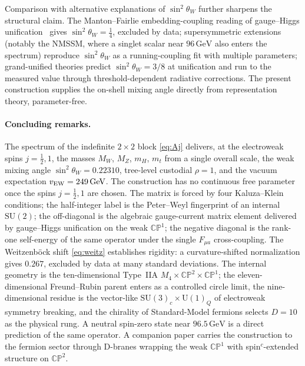 \documentclass[aps,prl,twocolumn,superscriptaddress,floatfix,nofootinbib,reprint]{revtex4-2}
\newcommand{\half}{\tfrac12}
\newcommand{\sinsq}{\sin^{2}\!\theta_{W}}
\newcommand{\SU}{\mathrm{SU}}
\newcommand{\U}{\mathrm{U}}
\newcommand{\CP}{\mathbb{CP}}
\begin{document}
Comparison with alternative explanations of $\sinsq$ further sharpens
the structural claim.  The Manton--Fairlie embedding-coupling reading
of gauge--Higgs unification~\cite{Manton1979,Fairlie1979} gives
$\sinsq=\tfrac14$, excluded by data; supersymmetric extensions
(notably the NMSSM, where a singlet scalar near $96\,\text{GeV}$ also
enters the spectrum) reproduce $\sinsq$ as a running-coupling fit
with multiple parameters; grand-unified theories predict
$\sinsq=3/8$ at unification and run to the measured value through
threshold-dependent radiative corrections.  The present construction
supplies the on-shell mixing angle directly from representation
theory, parameter-free.


\paragraph{Concluding remarks.}
The spectrum of the indefinite $2\times 2$ block \eqref{eq:Aj}
delivers, at the electroweak spins $j=\half,1$, the masses
$M_{W}$, $M_{Z}$, $m_{H}$, $m_{t}$ from a single overall scale, the
weak mixing angle $\sinsq=0.22310$, tree-level custodial $\rho=1$,
and the vacuum expectation $v_{\rm EW}=249\,\text{GeV}$.  The
construction has no continuous free parameter once the spins
$j=\half,1$ are chosen.  The matrix is forced by four Kaluza--Klein
conditions; the half-integer label is the Peter--Weyl fingerprint of
an internal $\SU(2)$; the off-diagonal is the algebraic gauge-current
matrix element delivered by gauge--Higgs unification on the weak
$\CP^{1}$; the negative diagonal is the rank-one self-energy of the
same operator under the single $F_{\mu a}$ cross-coupling.  The Weitzenb\"ock
shift \eqref{eq:weitz} establishes rigidity: a curvature-shifted
normalization gives $0.267$, excluded by data at many standard
deviations.  The internal geometry is the ten-dimensional Type~IIA
$M_{4}\times\CP^{2}\times\CP^{1}$; the eleven-dimensional Freund--Rubin
parent enters as a controlled circle limit, the nine-dimensional
residue is the vector-like $\SU(3)_{c}\times\U(1)_{Q}$ of electroweak
symmetry breaking, and the chirality of Standard-Model fermions
selects $D=10$ as the physical rung.  A neutral spin-zero state near
$96.5\,\text{GeV}$ is a direct prediction of the same operator.  A
companion paper carries the construction to the fermion sector
through D-branes wrapping the weak $\CP^{1}$ with spin$^{c}$-extended
structure on $\CP^{2}$.
\end{document}
